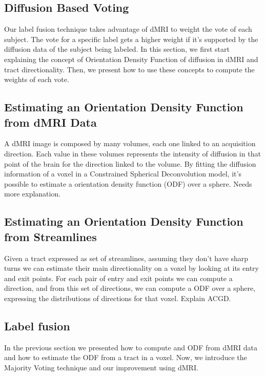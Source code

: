 \subsection{Diffusion Based Voting}

Our label fusion technique takes advantage of dMRI to weight the vote of each
subject. The vote for a specific label gets a higher weight if it's supported
by the diffusion data of the subject being labeled. In this section, we first
start explaining the concept of Orientation Density Function of diffusion in
dMRI and tract directionality. Then, we present how to use these concepts to
compute the weights of each vote.

\subsection{Estimating an Orientation Density Function from dMRI Data}
A dMRI image is composed by many volumes, each one linked to an acquisition
direction. Each value in these volumes represents the intensity of diffusion
in that point of the brain for the direction linked to the volume. By fitting
the diffusion information of a voxel in a Constrained Spherical Deconvolution
model, it's possible to estimate a orientation density function (ODF) over a
sphere. Needs more explanation.

\subsection{Estimating an Orientation Density Function from Streamlines}
Given a tract expressed as set of streamlines, assuming they don't have sharp
turns we can estimate their main directionality on a voxel by looking at its
entry and exit points. For each pair of entry and exit points we can compute a
direction, and from this set of directions, we can compute a ODF over a sphere,
expressing the distributions of directions for that voxel. Explain ACGD.

\subsection{Label fusion}
In the previous section we presented how to compute and ODF from dMRI data and
how to estimate the ODF from a tract in a voxel. Now, we introduce the Majority
Voting technique and our improvement using dMRI.


